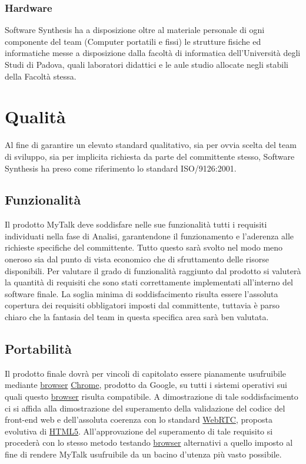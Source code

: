 \subsubsection{Hardware}
Software Synthesis ha a disposizione oltre al materiale personale di ogni componente del team (Computer portatili e fissi) le strutture fisiche ed informatiche messe a disposizione dalla facoltà di informatica dell'Università degli Studi di Padova, quali laboratori didattici e le aule studio allocate negli stabili della Facoltà stessa.

\clearpage
\section{Qualità}
Al fine di garantire un elevato standard qualitativo, sia per ovvia scelta del team di sviluppo, sia per implicita richiesta da parte del committente stesso, Software Synthesis ha preso come riferimento lo standard ISO/9126:2001.
 
\subsection{Funzionalità}
Il prodotto MyTalk deve soddisfare nelle sue funzionalità tutti i requisiti individuati nella fase di Analisi, garantendone il funzionamento e l'aderenza alle richieste specifiche del committente. Tutto questo sarà svolto nel modo meno oneroso sia dal punto di vista economico che di sfruttamento delle risorse disponibili.
Per valutare il grado di funzionalità raggiunto dal prodotto si valuterà la quantità di requisiti che sono stati correttamente implementati all'interno del software finale. La soglia minima di soddisfacimento risulta essere l'assoluta copertura dei requisiti obbligatori imposti dal committente, tuttavia è parso chiaro che la fantasia del team in questa specifica area sarà ben valutata.

\subsection{Portabilità}
Il prodotto finale dovrà per vincoli di capitolato essere pianamente usufruibile mediante \underline{browser} \underline{Chrome}, prodotto da Google, su tutti i sistemi operativi sui quali questo \underline{browser} risulta compatibile. 
A dimostrazione di tale soddisfacimento ci si affida alla dimostrazione del superamento della validazione del codice del front-end web e dell'assoluta coerenza con lo standard \underline{WebRTC}, proposta evolutiva di \underline{HTML5}.
All'approvazione del superamento di tale requisito si procederà con lo stesso metodo testando \underline{browser} alternativi a quello imposto al fine di rendere MyTalk usufruibile da un bacino d'utenza più vasto possibile.
